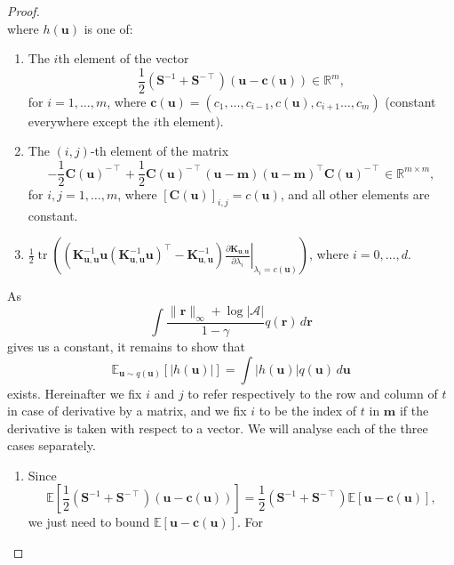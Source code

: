 \documentclass{article}
\theoremstyle{definition}
\DeclareMathOperator{\tr}{tr}
\newcommand{\Kuu}{\mathbf{K}_{\mathbf{u},\mathbf{u}}}
\newcommand{\rinf}{\lVert \mathbf{r} \rVert_\infty}
\newcommand{\vbound}{\frac{\rinf + \log|\mathcal{A}|}{1 - \gamma}}
\begin{document}
\begin{proof}
\[  \]
  where $h(\mathbf{u})$ is one of:
  \begin{enumerate}
  \item The $i$th element of the vector
    \[
      \frac{1}{2}(\mathbf{S}^{-1} + \mathbf{S}^{-\intercal})(\mathbf{u} -
      \mathbf{c}(\mathbf{u})) \in \mathbb{R}^m,
    \]
    for $i = 1, \dots, m$, where $\mathbf{c}(\mathbf{u}) = (c_1, \dots, c_{i -
      1}, c(\mathbf{u}), c_{i + 1} \dots, c_m)$ (constant everywhere except the
    $i$th element).
  \item The $(i,j)$-th element of the matrix
    \[
      -\frac{1}{2}\mathbf{C}(\mathbf{u})^{-\intercal} +
      \frac{1}{2}\mathbf{C}(\mathbf{u})^{-\intercal}(\mathbf{u} -
      \mathbf{m})(\mathbf{u} -
      \mathbf{m})^\intercal\mathbf{C}(\mathbf{u})^{-\intercal} \in \mathbb{R}^{m
        \times m},
    \]
    for $i, j = 1, \dots, m$, where $[\mathbf{C}(\mathbf{u})]_{i,j} =
    c(\mathbf{u})$, and all other elements are constant.
  \item $\frac{1}{2}\tr
    \left((\Kuu^{-1}\mathbf{u}(\Kuu^{-1}\mathbf{u})^\intercal - \Kuu^{-1})
      \left. \frac{\partial \Kuu}{\partial \lambda_i} \right|_{\lambda_i = c(\mathbf{u})}
    \right)$, where $i = 0, \dots, d$.
  \end{enumerate} %
  As
  \[
    \int \vbound q(\mathbf{r})\,d\mathbf{r}
  \]
  gives us a constant, it remains to show that
  \[
    \mathbb{E}_{\mathbf{u} \sim q(\mathbf{u})}[|h(\mathbf{u})|] = \int
    |h(\mathbf{u})| q(\mathbf{u}) \,d\mathbf{u}
  \]
  exists. Hereinafter we fix $i$ and $j$ to refer respectively to the row and
  column of $t$ in case of derivative by a matrix, and we fix $i$ to be the
  index of $t$ in $\mathbf{m}$ if the derivative is taken with respect to a
  vector. We will analyse each of the three cases separately.
  \begin{enumerate}
  \item Since
    \[
      \mathbb{E} \left[ \frac{1}{2}(\mathbf{S}^{-1} +
        \mathbf{S}^{-\intercal})(\mathbf{u} - \mathbf{c}(\mathbf{u})) \right] =
      \frac{1}{2}(\mathbf{S}^{-1} + \mathbf{S}^{-\intercal})
      \mathbb{E}[\mathbf{u} - \mathbf{c}(\mathbf{u})],
    \]
    we just need to bound $\mathbb{E}[\mathbf{u} - \mathbf{c}(\mathbf{u})]$. For

\end{enumerate}
\end{proof}
\end{document}
